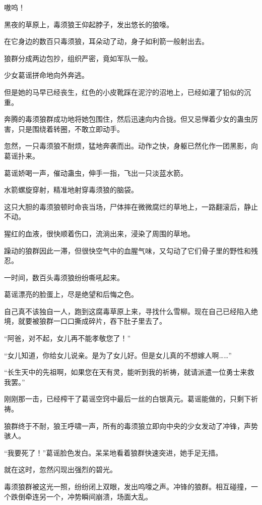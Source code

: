 
\begin{this_body}

嗷呜！

黑夜的草原上，毒须狼王仰起脖子，发出悠长的狼嚎。

在它身边的数百只毒须狼，耳朵动了动，身子如利箭一般射出去。

狼群分成两边包抄，组织严密，竟如军队一般。

少女葛谣拼命地向外奔逃。

但是她的马早已经丧生，红色的小皮靴踩在泥泞的沼地上，已经如灌了铅似的沉重。

奔腾的毒须狼群成功地将她包围住，然后迅速向内合拢。但又忌惮着少女的蛊虫厉害，只是围绕着转圈，不敢立即动手。

忽然，一只毒须狼不耐烦，猛地奔袭而出。动作之快，身躯已然化作一团黑影，向葛谣扑来。

葛谣娇喝一声，催动蛊虫，伸手一指，飞出一只淡蓝水箭。

水箭螺旋穿射，精准地射穿毒须狼的脑袋。

这只大胆的毒须狼顿时命丧当场，尸体摔在微微腐烂的草地上，一路翻滚后，静止不动。

猩红的血液，很快顺着伤口，流淌出来，浸染了周围的草地。

躁动的狼群因此一滞，但很快空气中的血腥气味，又勾动了它们骨子里的野性和残忍。

一时间，数百头毒须狼纷纷嘶吼起来。

葛谣漂亮的脸蛋上，尽是绝望和后悔之色。

自己真不该独自一人，跑到这腐毒草原上来，寻找什么雪柳。现在自己已经陷入绝境，就要被狼群一口口撕成碎片，吞下肚子里去了。

“阿爸，对不起，女儿再不能孝敬您了！”

“女儿知道，你给女儿说亲。是为了女儿好。但是女儿真的不想嫁人啊……”

“长生天中的先祖啊，如果您在天有灵，能听到我的祈祷，就请派遣一位勇士来救我罢。”

刚刚那一击，已经榨干了葛谣空窍中最后一丝的白银真元。葛谣能做的，只剩下祈祷。

狼群终于不耐，狼王呼啸一声，所有的毒须狼立即向中央的少女发动了冲锋，声势骇人。

“我要死了！”葛谣脸色发白。呆呆地看着狼群快速突进，她手足无措。

就在这时，忽然闪现出强烈的碧光。

毒须狼群被这光一照，纷纷闭上双眼，发出呜嚎之声。冲锋的狼群。相互碰撞，一个跌倒牵连另一个，冲势瞬间崩溃，场面大乱。


\end{this_body}
